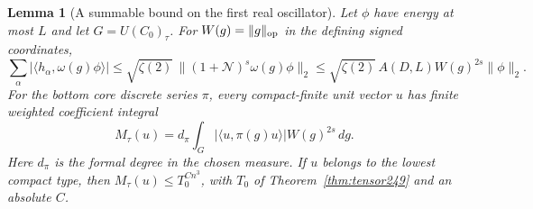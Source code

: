 \documentclass[a4paper,11pt]{article}
\newtheorem{lemma}[proposition]{Lemma}
\theoremstyle{definition}
\theoremstyle{remark}
\numberwithin{equation}{section}
\begin{document}
\begin{lemma}[A summable bound on the first real oscillator]\leavevmode
\label{lem:weightedhermite260}
Let \(\phi\) have energy at most \(L\) and let \(G=U(C_0)_\tau\).
For \(W(g)=\|g\|_{\rm op}\) in the defining signed coordinates,
\[
 \sum_\alpha|\langle h_\alpha,\omega(g)\phi\rangle|
 \le \sqrt{\zeta(2)}\,\|(1+\mathcal N)^s\omega(g)\phi\|_2
 \le \sqrt{\zeta(2)}\,A(D,L) W(g)^{2s}\|\phi\|_2 .
\]
For the bottom core discrete series \(\pi\), every compact-finite
unit vector \(u\) has finite weighted coefficient integral
\[
 M_\tau(u)=d_\pi\int_G
       |\langle u,\pi(g)u\rangle| W(g)^{2s}\,dg .
\]
Here \(d_\pi\) is the formal degree in the chosen measure.
If \(u\) belongs to the lowest compact type, then
\(M_\tau(u)\le T_0^{C n^3}\), with \(T_0\) of
Theorem~\ref{thm:tensor249} and an absolute \(C\).
\end{lemma}
\end{document}
